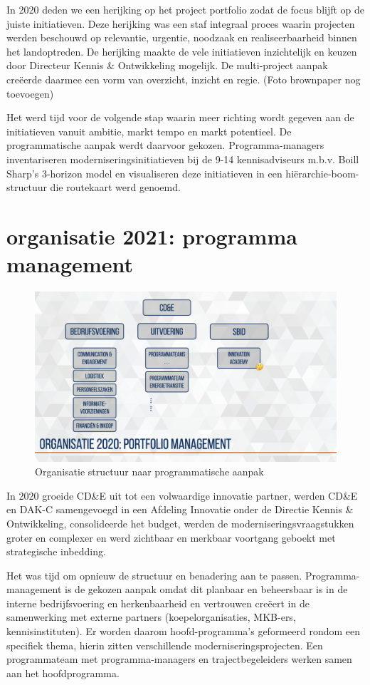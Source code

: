 \documentclass[
]{book}
\begin{document}
In 2020 deden we een herijking op het project portfolio zodat de focus blijft op de juiste initiatieven. Deze herijking was een staf integraal proces waarin projecten werden beschouwd op relevantie, urgentie, noodzaak en realiseerbaarheid binnen het landoptreden. De herijking maakte de vele initiatieven inzichtelijk en keuzen door Directeur Kennis \& Ontwikkeling mogelijk. De multi-project aanpak creëerde daarmee een vorm van overzicht, inzicht en regie. (Foto brownpaper nog toevoegen)

Het werd tijd voor de volgende stap waarin meer richting wordt gegeven aan de initiatieven vanuit ambitie, markt tempo en markt potentieel. De programmatische aanpak werdt daarvoor gekozen. Programma-managers inventariseren moderniseringsinitiatieven bij de 9-14 kennisadviseurs m.b.v. Boill Sharp's 3-horizon model en visualiseren deze initiatieven in een hiërarchie-boom-structuur die routekaart werd genoemd.

\hypertarget{organisatie-2021-programma-management}{%
\section{organisatie 2021: programma management}\label{organisatie-2021-programma-management}}

\begin{figure}

{\centering \includegraphics[width=0.5\linewidth]{data/keynote-slides/20200430-CDE-Designprocess/20200430-CDE-Designprocess.009-4} 

}

\caption{Organisatie structuur naar programmatische aanpak }\label{fig:unnamed-chunk-28}
\end{figure}

In 2020 groeide CD\&E uit tot een volwaardige innovatie partner, werden CD\&E en DAK-C samengevoegd in een Afdeling Innovatie onder de Directie Kennis \& Ontwikkeling, consolideerde het budget, werden de moderniseringsvraagstukken groter en complexer en werd zichtbaar en merkbaar voortgang geboekt met strategische inbedding.

Het was tijd om opnieuw de structuur en benadering aan te passen. Programma-management is de gekozen aanpak omdat dit planbaar en beheersbaar is in de interne bedrijfsvoering en herkenbaarheid en vertrouwen creëert in de samenwerking met externe partners (koepelorganisaties, MKB-ers, kennisinstituten). Er worden daarom hoofd-programma's geformeerd rondom een specifiek thema, hierin zitten verschillende moderniseringsprojecten. Een programmateam met programma-managers en trajectbegeleiders werken samen aan het hoofdprogramma.
\end{document}
